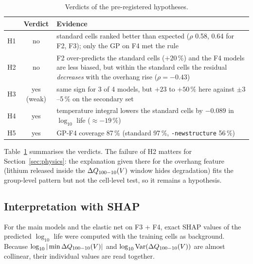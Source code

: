 \begin{table}[t]
\centering
\caption{Verdicts of the pre-registered hypotheses.}
\label{tab:p5hyp}
\setlength{\tabcolsep}{3pt}
\begin{tabular}{@{}lcp{}@{}}
\toprule
& Verdict & Evidence \\
\midrule
H1 & no & standard cells ranked better than expected ($\rho$ 0.58, 0.64 for F2, F3); only the GP on F4 met the rule \\
H2 & no & F2 over-predicts the standard cells ($+20\,\%$) and the F4 models are less biased, but within the standard cells the residual \emph{decreases} with the overhang rise ($\rho=-0.43$) \\
H3 & yes (weak) & same sign for 3 of 4 models, but $+23$ to $+50\,\%$ here against $\pm3$--5\,\% on the secondary set \\
H4 & yes & temperature integral lowers the standard cells by $-0.089$ in $\log_{10}$ life ($\approx-19\,\%$) \\
H5 & yes & GP-F4 coverage 87\,\% (standard 97\,\%, \texttt{-newstructure} 56\,\%) \\
\bottomrule
\end{tabular}
\end{table}

Table~\ref{tab:p5hyp} summarises the verdicts. The failure of H2 matters for
Section~\ref{sec:physics}: the explanation given there for the overhang
feature (lithium released inside the $\Delta Q_{100-10}(V)$ window hides degradation) fits the
group-level pattern but not the cell-level test, so it remains a hypothesis.

\subsection{Interpretation with SHAP}
For the main models and the elastic net on F3 + F4, exact SHAP values of the
predicted $\log_{10}$ life were computed with the training cells as
background. Because $\log_{10}|\min\Delta Q_{100-10}(V)|$ and $\log_{10}\mathrm{Var}(\Delta Q_{100-10}(V))$ are almost
collinear, their individual values are read together.

